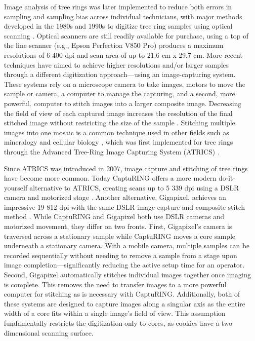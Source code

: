 \documentclass[a4paper,12pt]{article}
\begin{document}
Image analysis of tree rings was later implemented to reduce both errors in sampling and sampling bias across individual technicians, with major methods developed in the 1980s and 1990s to digitize tree ring samples using optical scanning \citep{mcmillin_application_1982,guay_new_1992}. Optical scanners are still readily available for purchase, using a top of the line scanner (e.g., Epson Perfection V850 Pro) produces a maximum resolutions of 6 400 dpi and scan area of up to 21.6 cm x 29.7 cm.
More recent techniques have aimed to achieve higher resolutions and/or larger samples through a different digitization approach---using an image-capturing system. These systems rely on a microscope camera to take images, motors to move the sample or camera, a computer to manage the capturing, and a second, more powerful, computer to stitch images into a larger composite image.
Decreasing the field of view of each captured image increases the resolution of the final stitched image without restricting the size of the sample \citep{muhlich_stitching_2022}.
Stitching multiple images into one mosaic is a common technique used in other fields such as mineralogy and cellular biology \citep{ro_image_2021}, which was
first implemented for tree rings through the Advanced Tree-Ring Image Capturing System (ATRICS) \citep{levanic_atrics_2007}. %

Since ATRICS was introduced in 2007, image capture and stitching of tree rings have become more common. Today CaptuRING offers a more modern do-it-yourself alternative to ATRICS, creating scans up to 5 339 dpi using a DSLR camera and motorized stage \citep{garcia-hidalgo_capturing_2022}. 
Another alternative, Gigapixel, achieves an impressive 19 812 dpi with the same DSLR image capture and composite stitch method \citep{griffin_gigapixel_2021}. 
While CaptuRING and Gigapixel both use DSLR cameras and motorized movement, they differ on two fronts. 
First, Gigapixel's camera is traversed across a stationary sample while CaptuRING moves a core sample underneath a stationary camera.
With a mobile camera, multiple samples can be recorded sequentially without needing to remove a sample from a stage upon image completion---significantly reducing the active setup time for an operator. 
Second, Gigapixel automatically stitches individual images together once imaging is complete. This removes the need to transfer images to a more powerful computer for stitching as is necessary with CaptuRING.
Additionally, both of these systems are designed to capture images along a singular axis as the entire width of a core fits within a single image's field of view.
This assumption fundamentally restricts the digitization only to cores, as cookies have a two dimensional scanning surface. %
\end{document}
